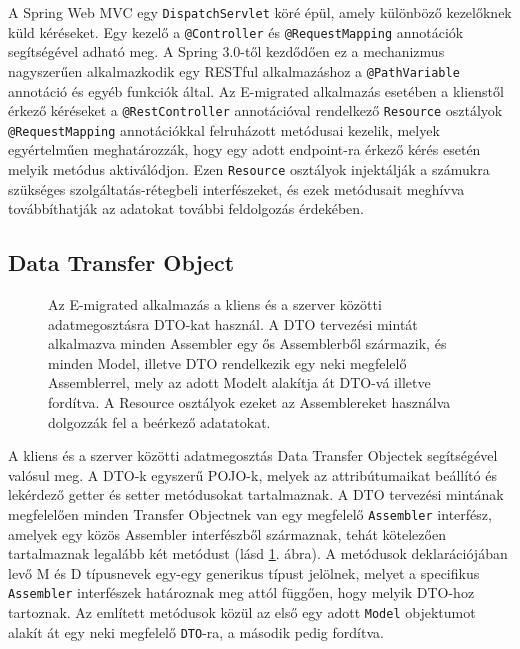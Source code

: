 A Spring Web MVC egy \texttt{DispatchServlet} köré épül, amely különböző kezelőknek küld kéréseket. Egy kezelő a \texttt{@Controller} és \texttt{@RequestMapping} annotációk segítségével adható meg. A Spring 3.0-től kezdődően ez a mechanizmus nagyszerűen alkalmazkodik egy RESTful alkalmazáshoz a \texttt{@PathVariable} annotáció és egyéb funkciók által.\cite{WebMVC} Az E-migrated alkalmazás esetében a klienstől érkező kéréseket a \texttt{@RestController} annotációval rendelkező \texttt{Resource} osztályok \texttt{@RequestMapping} annotációkkal felruházott metódusai kezelik, melyek egyértelműen meghatározzák, hogy egy adott endpoint-ra érkező kérés esetén melyik metódus aktiválódjon. Ezen \texttt{Resource} osztályok injektálják a számukra szükséges szolgáltatás-rétegbeli interfészeket, és ezek metódusait meghívva továbbíthatják az adatokat további feldolgozás érdekében.

\subsection{Data Transfer Object}
\label{subsubsec:DTO}
\begin{figure}[!b]
  \centering
  \caption{Az E-migrated alkalmazás a kliens és a szerver közötti adatmegosztásra DTO-kat használ. A DTO tervezési mintát alkalmazva minden Assembler egy ős Assemblerből származik, és minden Model, illetve DTO rendelkezik egy neki megfelelő Assemblerrel, mely az adott Modelt alakítja át DTO-vá illetve fordítva. A Resource osztályok ezeket az Assemblereket használva dolgozzák fel a beérkező adatatokat. }
  \label{fig:Assembler}
\end{figure}

A kliens és a szerver közötti adatmegosztás Data Transfer Objectek segítségével valósul meg. A DTO-k egyszerű POJO-k, melyek az attribútumaikat beállító és lekérdező getter és setter metódusokat tartalmaznak. A DTO tervezési mintának \cite{DTO} megfelelően minden Transfer Objectnek van egy megfelelő \texttt{Assembler} interfész, amelyek egy közös Assembler interfészből származnak, tehát kötelezően tartalmaznak legalább két metódust (lásd \ref{fig:Assembler}. ábra). A metódusok deklarációjában levő M és D típusnevek egy-egy generikus típust jelölnek, melyet a specifikus \texttt{Assembler} interfészek határoznak meg attól függően, hogy melyik DTO-hoz tartoznak. Az említett metódusok közül az első egy adott \texttt{Model} objektumot alakít át egy neki megfelelő \texttt{DTO}-ra, a második pedig fordítva. 

